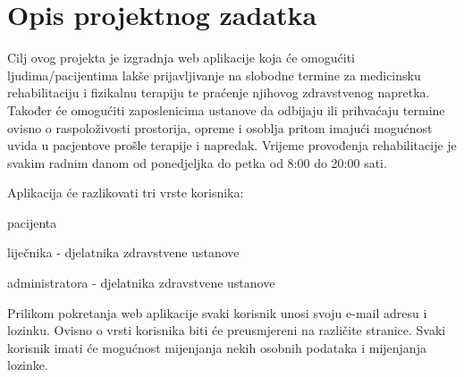 
\chapter{Opis projektnog zadatka}
		
		Cilj ovog projekta je izgradnja web aplikacije koja će omogućiti ljudima/pacijentima lakše prijavljivanje na slobodne termine za medicinsku rehabilitaciju i fizikalnu terapiju te praćenje njihovog zdravstvenog napretka. Također će omogućiti zaposlenicima ustanove da odbijaju ili prihvaćaju termine ovisno o raspoloživosti prostorija, opreme i osoblja pritom imajući mogućnost uvida u pacjentove prošle terapije i napredak. Vrijeme provođenja rehabilitacije je svakim radnim danom od ponedjeljka do petka od 8:00 do 20:00 sati.
		
		\noindent Aplikacija će razlikovati tri vrste korisnika: 
		\begin{packed_item}
			
			\item  pacijenta
			\item  liječnika - djelatnika zdravstvene ustanove
			\item  administratora - djelatnika zdravstvene ustanove
		\end{packed_item}
		
		Prilikom pokretanja web aplikacije svaki korisnik unosi svoju e-mail adresu i lozinku. Ovisno o vrsti korisnika biti će preusmjereni na različite stranice. Svaki korisnik imati će mogućnost mijenjanja nekih osobnih podataka i mijenjanja lozinke.
		

